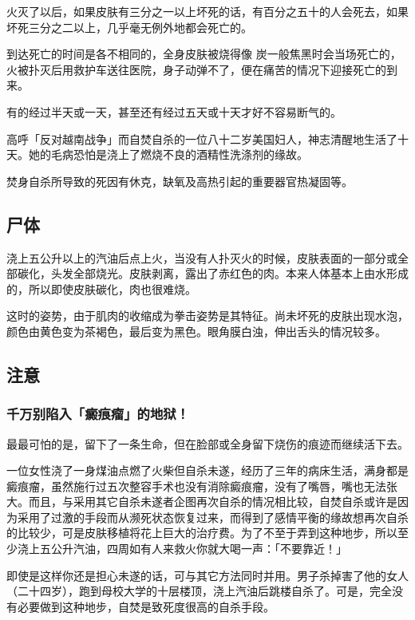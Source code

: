\documentclass[UTF8]{ctexart}
\begin{document}
火灭了以后，如果皮肤有三分之一以上坏死的话，有百分之五十的人会死去，如果坏死三分之二以上，几乎毫无例外地都会死亡的。

到达死亡的时间是各不相同的，全身皮肤被烧得像 炭一般焦黑时会当场死亡的，火被扑灭后用救护车送往医院，身子动弹不了，便在痛苦的情况下迎接死亡的到来。

有的经过半天或一天，甚至还有经过五天或十天才好不容易断气的。

高呼「反对越南战争」而自焚自杀的一位八十二岁美国妇人，神志清醒地生活了十天。她的毛病恐怕是浇上了燃烧不良的酒精性洗涤剂的缘故。

焚身自杀所导致的死因有休克，缺氧及高热引起的重要器官热凝固等。

\subsection{尸体}

浇上五公升以上的汽油后点上火，当没有人扑灭火的时候，皮肤表面的一部分或全部碳化，头发全部烧光。皮肤剥离，露出了赤红色的肉。本来人体基本上由水形成的，所以即使皮肤碳化，肉也很难烧。

这时的姿势，由于肌肉的收缩成为拳击姿势是其特征。尚未坏死的皮肤出现水泡，颜色由黄色变为茶褐色，最后变为黑色。眼角膜白浊，伸出舌头的情况较多。


\subsection{注意}

\subsubsection*{千万别陷入「癜痕瘤」的地狱！}

最最可怕的是，留下了一条生命，但在脸部或全身留下烧伤的痕迹而继续活下去。

一位女性浇了一身煤油点燃了火柴但自杀未遂，经历了三年的病床生活，满身都是癜痕瘤，虽然施行过五次整容手术也没有消除癜痕瘤，没有了嘴唇，嘴也无法张大。而且，与采用其它自杀未遂者企图再次自杀的情况相比较，自焚自杀或许是因为采用了过激的手段而从濒死状态恢复过来，而得到了感情平衡的缘故想再次自杀的比较少，可是皮肤移植将花上巨大的治疗费。为了不至于弄到这种地步，所以至少浇上五公升汽油，四周如有人来救火你就大喝一声：「不要靠近！」

即使是这样你还是担心未遂的话，可与其它方法同时并用。男子杀掉害了他的女人（二十四岁），跑到母校大学的十层楼顶，浇上汽油后跳楼自杀了。可是，完全没有必要做到这种地步，自焚是致死度很高的自杀手段。
\end{document}
